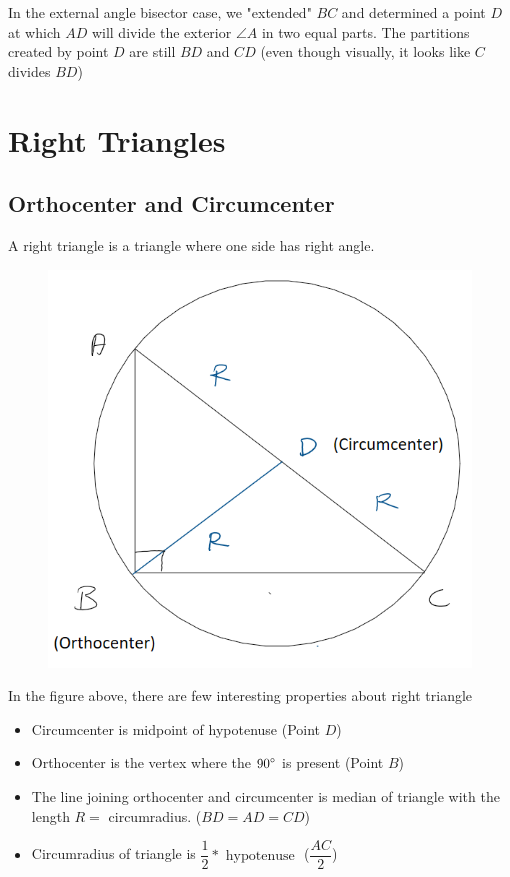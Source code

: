 In the external angle bisector case, we "extended" $BC$ and determined a point $D$ at which $AD$ will divide the exterior $\angle A$ in two equal parts. The partitions created by point $D$ are still $BD$ and $CD$ (even though visually, it looks like $C$ divides $BD$)





























\newpage

\section{Right Triangles}
\subsection{Orthocenter and Circumcenter}
A right triangle is a triangle where one side has right angle. 

\begin{figure}[h!]
    \centering
    \includegraphics[width=0.5\linewidth]{Quant//Geometry//Images//Triangles/rt_triangle_ortho_circumcenter.png}
\end{figure}

In the figure above, there are few interesting properties about right triangle
\begin{itemize}
    \item Circumcenter is midpoint of hypotenuse (Point $D$)
    \item Orthocenter is the vertex where the ${90}^{\circ}$ is present (Point $B$)
    \item The line joining orthocenter and circumcenter is median of triangle with the length $R = $ circumradius. ($BD = AD = CD$)
    \item Circumradius of triangle is $\dfrac{1}{2} * \text{ hypotenuse } $ ($\dfrac{AC}{2}$)
\end{itemize}

